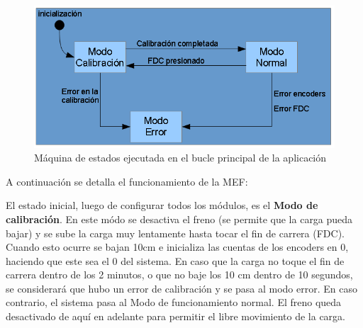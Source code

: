 \begin{figure}[!ht]
	\centering
	\includegraphics[width=16cm,scale=1]{resources/3_31-mefBuclePrincipal.png}
	\caption{Máquina de estados ejecutada en el bucle principal de la aplicación}
	\label{fig:\thefigure}
\end{figure}

A continuación se detalla el funcionamiento de la MEF:

El estado inicial, luego de configurar todos los módulos, es el \textbf{Modo de calibración}. En este módo se desactiva el freno (se permite que la carga pueda bajar) y se sube la carga muy lentamente hasta tocar el fin de carrera (FDC). Cuando esto ocurre se bajan 10cm e inicializa las cuentas de los encoders en 0, haciendo que este sea el 0 del sistema. En caso que la carga no toque el fin de carrera dentro de los 2 minutos, o que no baje los 10 cm dentro de 10 segundos, se considerará que hubo un error de calibración y se pasa al modo error. En caso contrario, el sistema pasa al Modo de funcionamiento normal. El freno queda desactivado de aquí en adelante para permitir el libre movimiento de la carga.

